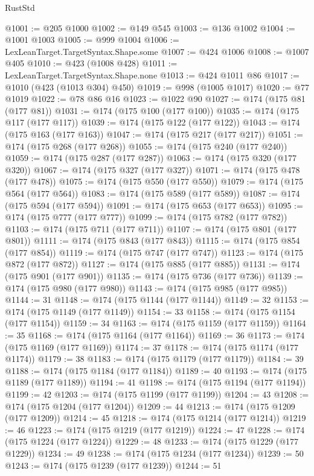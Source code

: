 \begin{lexlean}{RustStd}
\begin{coremodule}
@1001 := @205 @1000
@1002 := @149 @545
@1003 := @136 @1002
@1004 := @1001 @1003
@1005 := @999 @1004
@1006 := LexLeanTarget.TargetSyntax.Shape.some
@1007 := @424 @1006
@1008 := @1007 @405
@1010 := @423 (@1008 @428)
@1011 := LexLeanTarget.TargetSyntax.Shape.none
@1013 := @424 @1011 @86
@1017 := @1010 (@423 (@1013 @304) @450)
@1019 := @998 (@1005 @1017)
@1020 := @77 @1019
@1022 := @78 @86 @16
@1023 := @1022 @90
@1027 := @174 (@175 @81 (@177 @81))
@1031 := @174 (@175 @100 (@177 @100))
@1035 := @174 (@175 @117 (@177 @117))
@1039 := @174 (@175 @122 (@177 @122))
@1043 := @174 (@175 @163 (@177 @163))
@1047 := @174 (@175 @217 (@177 @217))
@1051 := @174 (@175 @268 (@177 @268))
@1055 := @174 (@175 @240 (@177 @240))
@1059 := @174 (@175 @287 (@177 @287))
@1063 := @174 (@175 @320 (@177 @320))
@1067 := @174 (@175 @327 (@177 @327))
@1071 := @174 (@175 @478 (@177 @478))
@1075 := @174 (@175 @550 (@177 @550))
@1079 := @174 (@175 @564 (@177 @564))
@1083 := @174 (@175 @589 (@177 @589))
@1087 := @174 (@175 @594 (@177 @594))
@1091 := @174 (@175 @653 (@177 @653))
@1095 := @174 (@175 @777 (@177 @777))
@1099 := @174 (@175 @782 (@177 @782))
@1103 := @174 (@175 @711 (@177 @711))
@1107 := @174 (@175 @801 (@177 @801))
@1111 := @174 (@175 @843 (@177 @843))
@1115 := @174 (@175 @854 (@177 @854))
@1119 := @174 (@175 @747 (@177 @747))
@1123 := @174 (@175 @872 (@177 @872))
@1127 := @174 (@175 @885 (@177 @885))
@1131 := @174 (@175 @901 (@177 @901))
@1135 := @174 (@175 @736 (@177 @736))
@1139 := @174 (@175 @980 (@177 @980))
@1143 := @174 (@175 @985 (@177 @985))
@1144 := 31
@1148 := @174 (@175 @1144 (@177 @1144))
@1149 := 32
@1153 := @174 (@175 @1149 (@177 @1149))
@1154 := 33
@1158 := @174 (@175 @1154 (@177 @1154))
@1159 := 34
@1163 := @174 (@175 @1159 (@177 @1159))
@1164 := 35
@1168 := @174 (@175 @1164 (@177 @1164))
@1169 := 36
@1173 := @174 (@175 @1169 (@177 @1169))
@1174 := 37
@1178 := @174 (@175 @1174 (@177 @1174))
@1179 := 38
@1183 := @174 (@175 @1179 (@177 @1179))
@1184 := 39
@1188 := @174 (@175 @1184 (@177 @1184))
@1189 := 40
@1193 := @174 (@175 @1189 (@177 @1189))
@1194 := 41
@1198 := @174 (@175 @1194 (@177 @1194))
@1199 := 42
@1203 := @174 (@175 @1199 (@177 @1199))
@1204 := 43
@1208 := @174 (@175 @1204 (@177 @1204))
@1209 := 44
@1213 := @174 (@175 @1209 (@177 @1209))
@1214 := 45
@1218 := @174 (@175 @1214 (@177 @1214))
@1219 := 46
@1223 := @174 (@175 @1219 (@177 @1219))
@1224 := 47
@1228 := @174 (@175 @1224 (@177 @1224))
@1229 := 48
@1233 := @174 (@175 @1229 (@177 @1229))
@1234 := 49
@1238 := @174 (@175 @1234 (@177 @1234))
@1239 := 50
@1243 := @174 (@175 @1239 (@177 @1239))
@1244 := 51

\end{coremodule}
\end{lexlean}
